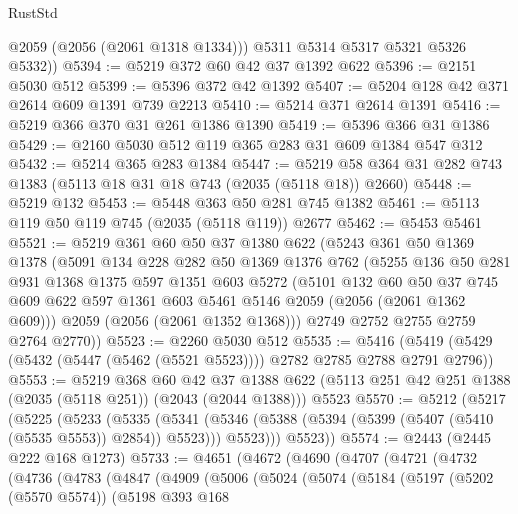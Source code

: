\begin{lexlean}{RustStd}
\begin{coremodule}
          @2059
          (@2056 (@2061 @1318 @1334)))
        @5311
        @5314
        @5317
        @5321
        @5326
        @5332))
@5394 := @5219 @372 @60 @42 @37 @1392 @622
@5396 := @2151 @5030 @512
@5399 := @5396 @372 @42 @1392
@5407 := @5204 @128 @42 @371 @2614 @609 @1391 @739 @2213
@5410 := @5214 @371 @2614 @1391
@5416 := @5219 @366 @370 @31 @261 @1386 @1390
@5419 := @5396 @366 @31 @1386
@5429 := @2160 @5030 @512 @119 @365 @283 @31 @609 @1384 @547 @312
@5432 := @5214 @365 @283 @1384
@5447 := @5219 @58 @364 @31 @282 @743 @1383 (@5113 @18 @31 @18 @743 (@2035 (@5118 @18)) @2660)
@5448 := @5219 @132
@5453 := @5448 @363 @50 @281 @745 @1382
@5461 := @5113 @119 @50 @119 @745 (@2035 (@5118 @119)) @2677
@5462 := @5453 @5461
@5521 := @5219
    @361
    @60
    @50
    @37
    @1380
    @622
    (@5243
      @361
      @50
      @1369
      @1378
      (@5091
        @134
        @228
        @282
        @50
        @1369
        @1376
        @762
        (@5255
          @136
          @50
          @281
          @931
          @1368
          @1375
          @597
          @1351
          @603
          @5272
          (@5101
            @132
            @60
            @50
            @37
            @745
            @609
            @622
            @597
            @1361
            @603
            @5461
            @5146
            @2059
            (@2056 (@2061 @1362 @609)))
          @2059
          (@2056 (@2061 @1352 @1368)))
        @2749
        @2752
        @2755
        @2759
        @2764
        @2770))
@5523 := @2260 @5030 @512
@5535 := @5416 (@5419 (@5429 (@5432 (@5447 (@5462 (@5521 @5523)))) @2782 @2785 @2788 @2791 @2796))
@5553 := @5219
    @368
    @60
    @42
    @37
    @1388
    @622
    (@5113 @251 @42 @251 @1388 (@2035 (@5118 @251)) (@2043 (@2044 @1388)))
    @5523
@5570 := @5212
    (@5217
      (@5225
        (@5233
          (@5335
            (@5341
              (@5346 (@5388 (@5394 (@5399 (@5407 (@5410 (@5535 @5553)) @2854)) @5523)))
              @5523)))
        @5523))
@5574 := @2443 (@2445 @222 @168 @1273)
@5733 := @4651
    (@4672
      (@4690
        (@4707
          (@4721
            (@4732
              (@4736
                (@4783
                  (@4847
                    (@4909
                      (@5006
                        (@5024
                          (@5074
                            (@5184
                              (@5197
                                (@5202 (@5570 @5574))
                                (@5198
                                  @393
                                  @168

\end{coremodule}
\end{lexlean}
